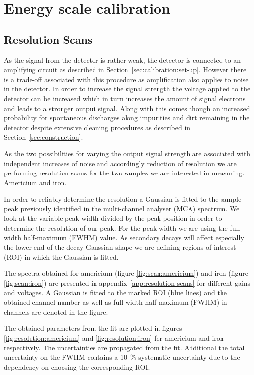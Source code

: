 \section{Energy scale calibration}

\subsection{Resolution Scans}
\label{sec:resolution_scans}
As the signal from the detector is rather weak, the detector is connected to an
amplifying circuit as described in Section~\ref{sec:calibration:set-up}. However
there is a trade-off associated with this procedure as amplification also
applies to noise in the detector. In order to increase the signal strength the
voltage applied to the detector can be increased which in turn increases the
amount of signal electrons and leads to a stronger output signal. Along with
this comes though an increased probability for spontaneous discharges along
impurities and dirt remaining in the detector despite extensive cleaning
procedures as described in Section~\ref{sec:construction}.

As the two possibilities for varying the output signal strength are associated
with independent increases of noise and accordingly reduction of resolution we
are performing resolution scans for the two samples we are interested in
measuring: Americium and iron.

In order to reliably determine the resolution a Gaussian is fitted to the sample
peak previously identified in the multi-channel analyser (MCA) spectrum. We look
at the variable peak width divided by the peak position in order to determine
the resolution of our peak. For the peak width we are using the full-width
half-maximum (FWHM) value. As secondary decays will affect especially the lower
end of the decay Gaussian  shape we are defining regions of interest (ROI) in which the Gaussian
is fitted.

The spectra obtained for americium (figure \ref{fig:scan:americium}) and iron
(figure \ref{fig:scan:iron}) are presented in appendix~\ref{app:resolution-scans} for different gains and voltages.
A Gaussian is fitted to the marked ROI (blue lines) and the obtained channel number as well as
full-width half-maximum (FWHM) in channels are denoted in the figure.

The obtained parameters from the fit are plotted in figures
\ref{fig:resolution:americium} and \ref{fig:resolution:iron} for americium and
iron respectively. The uncertainties are propagated from the fit. Additional the
total uncertainty on the FWHM contains a \SI{10}{\percent} systematic
uncertainty due to the dependency on choosing the corresponding ROI.

